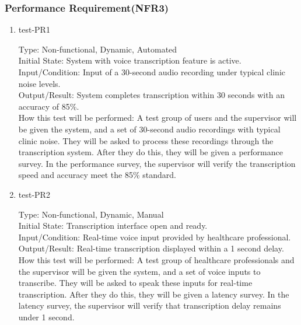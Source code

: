 \documentclass[12pt, titlepage]{article}
\begin{document}
\subsubsection{Performance Requirement(NFR3)} \label{section:4.2.3}

\begin{enumerate}
    \item{test-PR1\\} \label{test-PR1}
    
    Type: Non-functional, Dynamic, Automated\\
    
    Initial State: System with voice transcription feature is active.\\
    
    Input/Condition: Input of a 30-second audio recording under typical clinic noise levels.\\
    
    Output/Result: System completes transcription within 30 seconds with an accuracy of 85\%.\\
    
    How this test will be performed: A test group of users and the supervisor will be given the system, and a set of 30-second audio recordings with typical clinic noise. They will be asked to process these recordings through the transcription system. After they do this, they will be given a performance survey. In the performance survey, the supervisor will verify the transcription speed and accuracy meet the 85\% standard.

    \item{test-PR2\\} \label{test-PR2}
    
    Type: Non-functional, Dynamic, Manual\\
    
    Initial State: Transcription interface open and ready.\\
    
    Input/Condition: Real-time voice input provided by healthcare professional.\\
    
    Output/Result: Real-time transcription displayed within a 1 second delay.\\
    
    How this test will be performed: A test group of healthcare professionals and the supervisor will be given the system, and a set of voice inputs to transcribe. They will be asked to speak these inputs for real-time transcription. After they do this, they will be given a latency survey. In the latency survey, the supervisor will verify that transcription delay remains under 1 second.
\end{enumerate}
\end{document}
